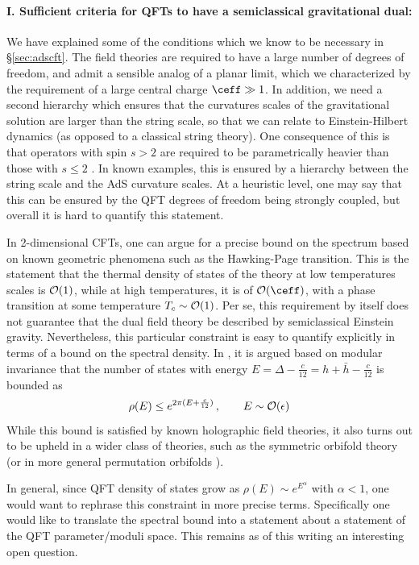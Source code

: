 \documentclass[12pt,openany]{book}
\begin{document}
\paragraph{I. Sufficient criteria for QFTs to have a semiclassical gravitational dual:}  We have explained some of the  conditions which we know to be necessary in  \S\ref{sec:adscft}. The field theories are required to have a large number of degrees of freedom, and admit a sensible analog of a planar limit, which we characterized by the requirement of a large central charge $\ceff \gg 1$. In addition, we need a second hierarchy which ensures that the curvatures scales of the gravitational solution are larger than the string scale, so that we can relate to Einstein-Hilbert dynamics (as opposed to a classical string theory). One consequence of this is that operators with spin $s >2 $ are required to be parametrically heavier than those with $s \leq 2$ \cite{Heemskerk:2009pn}. In known examples, this is ensured by a hierarchy between the string  scale and the AdS curvature scales. At a heuristic level, one may say that this can be ensured by the QFT degrees of freedom being strongly coupled, but overall it is hard to quantify this statement.

In 2-dimensional CFTs, one can argue for a precise bound on the spectrum based on known geometric phenomena such as the Hawking-Page transition. This is the statement that the thermal density of states of the theory at low temperatures scales is ${\cal O}(1)$, while at high temperatures, it is of ${\cal O}(\ceff)$, with a phase transition at some temperature $T_c \sim {\cal O}(1)$. Per se, this requirement by itself does not guarantee that the dual field theory be described by semiclassical Einstein gravity. Nevertheless, this particular constraint is easy to  quantify  explicitly in terms of a bound on the spectral density.  In \cite{Hartman:2014oaa}, it is argued based on modular invariance that the number of states with energy $E = \Delta - \frac{c}{12} = h+\bar{h} - \frac{c}{12}$ is bounded as
%
\begin{equation}
\rho(E) \leq e^{2\pi(E + \frac{c}{12})} \,, \qquad E \sim {\cal O}(\epsilon)
\label{}
\end{equation}
%
While this bound is satisfied by known holographic field theories,  it also turns out to be upheld in a wider class of theories, such as the symmetric orbifold theory (or in more general permutation orbifolds \cite{Haehl:2014yla,Belin:2014fna,Belin:2015hwa}).

In general, since QFT density of states grow as $\rho(E) \sim e^{E^\alpha}$ with $\alpha <1$, one would want to rephrase this constraint in more precise terms. Specifically one would like to translate the spectral bound into a statement about a statement of the QFT parameter/moduli space. This remains as of this writing an interesting open question.
\end{document}

